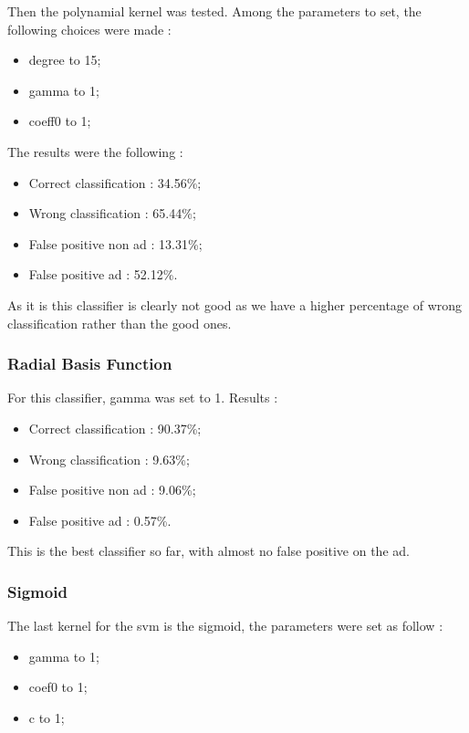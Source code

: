 Then the polynamial kernel was tested. Among the parameters to set, the following choices were made :
\begin{itemize}
  \item degree to 15;
  \item gamma to 1;
  \item coeff0 to 1;
\end{itemize}

The results were the following :

\begin{itemize}
  \item Correct classification : 34.56\%;
  \item Wrong classification : 65.44\%;
  \item False positive non ad : 13.31\%;
  \item False positive ad : 52.12\%.
\end{itemize}

As it is this classifier is clearly not good as we have a higher percentage of wrong classification rather than the good ones.

\subsubsection{Radial Basis Function}

For this classifier, gamma was set to 1.
Results :
\begin{itemize}
  \item Correct classification : 90.37\%;
  \item Wrong classification : 9.63\%;
  \item False positive non ad : 9.06\%;
  \item False positive ad : 0.57\%.
\end{itemize}

This is the best classifier so far, with almost no false positive on the ad.


\subsubsection{Sigmoid}

The last kernel for the svm is the sigmoid, the parameters were set as follow :
\begin{itemize}
  \item gamma to 1;
  \item coef0 to 1;
  \item c to 1;
\end{itemize}

